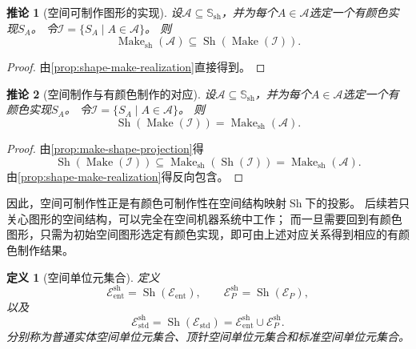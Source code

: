 \documentclass[UTF8,fontset=none]{ctexart}
\theoremstyle{cnthm}
\newtheorem{definition}{定义}[section]
\newtheorem{corollary}{推论}[section]
\begin{document}
			\begin{corollary}[空间可制作图形的实现]\label{cor:shape-make-realizable}
				设$\mathcal{A}\subseteq\mathbb{S}_{\mathrm{sh}}$，并为每个$A\in\mathcal{A}$选定一个有颜色实现$S_A$。
				令$\mathcal{I}=\{S_A\mid A\in\mathcal{A}\}$。
				则
				$$
				\operatorname{Make}_{\mathrm{sh}}(\mathcal{A})
				\subseteq
				\operatorname{Sh}(\operatorname{Make}(\mathcal{I})).
				$$
			\end{corollary}
			
			\begin{proof}
				由\cref{prop:shape-make-realization}直接得到。
			\end{proof}
			
			\begin{corollary}[空间制作与有颜色制作的对应]\label{cor:shape-colored-make-correspondence}
				设$\mathcal{A}\subseteq\mathbb{S}_{\mathrm{sh}}$，并为每个$A\in\mathcal{A}$选定一个有颜色实现$S_A$。
				令$\mathcal{I}=\{S_A\mid A\in\mathcal{A}\}$。
				则
				$$
				\operatorname{Sh}(\operatorname{Make}(\mathcal{I}))
				=
				\operatorname{Make}_{\mathrm{sh}}(\mathcal{A}).
				$$
			\end{corollary}
			
			\begin{proof}
				由\cref{prop:make-shape-projection}得
				$$
				\operatorname{Sh}(\operatorname{Make}(\mathcal{I}))
				\subseteq
				\operatorname{Make}_{\mathrm{sh}}(\operatorname{Sh}(\mathcal{I}))
				=
				\operatorname{Make}_{\mathrm{sh}}(\mathcal{A}).
				$$
				由\cref{prop:shape-make-realization}得反向包含。
			\end{proof}
			
			因此，空间可制作性正是有颜色可制作性在空间结构映射$\operatorname{Sh}$下的投影。
			后续若只关心图形的空间结构，可以完全在空间机器系统中工作；
			而一旦需要回到有颜色图形，只需为初始空间图形选定有颜色实现，即可由上述对应关系得到相应的有颜色制作结果。
			
			\begin{definition}[空间单位元集合]
				定义
				$$
				\mathcal{E}_{\mathrm{ent}}^{\mathrm{sh}}
				=
				\operatorname{Sh}(\mathcal{E}_{\mathrm{ent}}),
				\qquad
				\mathcal{E}_{P}^{\mathrm{sh}}
				=
				\operatorname{Sh}(\mathcal{E}_{P}),
				$$
				以及
				$$
				\mathcal{E}_{\mathrm{std}}^{\mathrm{sh}}
				=
				\operatorname{Sh}(\mathcal{E}_{\mathrm{std}})
				=
				\mathcal{E}_{\mathrm{ent}}^{\mathrm{sh}}
				\cup
				\mathcal{E}_{P}^{\mathrm{sh}}.
				$$
				分别称为普通实体空间单位元集合、顶针空间单位元集合和标准空间单位元集合。
			\end{definition}
			
\end{document}
